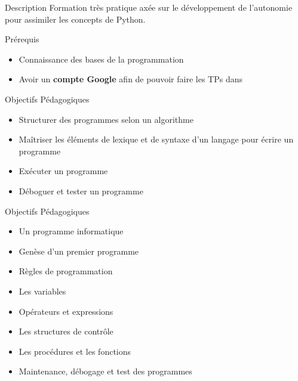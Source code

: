 \begin{frame}{Description}
  Formation très pratique axée sur le développement de l'autonomie pour assimiler les concepts de Python.
\end{frame}

\begin{frame}{Prérequis}
  \begin{itemize}
  \item Connaissance des bases de la programmation
  \item Avoir un \textbf{compte Google} afin de pouvoir faire les TPs dans 
  \end{itemize}
\end{frame}

\begin{frame}{Objectifs Pédagogiques}
  \begin{itemize}
    \item  Structurer des programmes selon un algorithme
    \item  Maîtriser les éléments de lexique et de syntaxe d'un langage pour écrire un programme
    \item  Exécuter un programme
    \item  Déboguer et tester un programme
  \end{itemize}
\end{frame}

\begin{frame}{Objectifs Pédagogiques}
  \begin{itemize} 
    \item Un programme informatique
    \item Genèse d'un premier programme
    \item Règles de programmation
    \item Les variables
    \item Opérateurs et expressions
    \item Les structures de contrôle
    \item Les procédures et les fonctions
    \item Maintenance, débogage et test des programmes 
  \end{itemize}
\end{frame}

